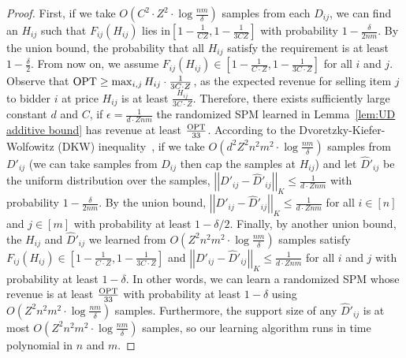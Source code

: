 \begin{proof}
	First, if we take $O\left(C^2\cdot Z^2\cdot \log \frac{nm}{\delta}\right)$ samples from each $D_{ij}$, we can find an $H_{ij}$ such that $F_{ij}(H_{ij})$ lies in$[1-\frac{1}{CZ}, 1-\frac{1}{3CZ}]$ with probability $1-\frac{\delta}{2nm}$. By the union bound, the probability that all $H_{ij}$ satisfy the requirement is at least $1-\frac{\delta}{2}$. From now on, we assume $F_{ij}(H_{ij})\in[1-\frac{1}{C\cdot Z}, 1-\frac{1}{3C\cdot Z}]$ for all $i$ and $j$. 
	Observe that $\text{OPT} \geq \max_{i,j} H_{ij}\cdot \frac{1}{3C\cdot Z}$, as the expected revenue for selling item $j$ to bidder $i$ at price $H_{ij}$ is at least $ \frac{H_{ij}}{3C\cdot Z}$.
	 Therefore, there exists sufficiently large constant $d$ and $C$, if $\epsilon=\frac{1}{d\cdot Z nm}$ the randomized SPM learned in Lemma~\ref{lem:UD additive bound} has revenue at least $\frac{\text{OPT}}{33}$.
	  According to the Dvoretzky-Kiefer-Wolfowitz (DKW) inequality~\cite{DvoretzkyKW56}, if we take $O\left(d^2 Z^2n^2m^2\cdot \log \frac{nm}{\delta} \right)$ samples from $D'_{ij}$ (we can take samples from $D_{ij}$ then cap the samples at $H_{ij}$) and let $\hat{D}'_{ij}$ be the uniform distribution over the samples, $\left|\left|D'_{ij}-\hat{D}'_{ij}\right|\right|_K\leq \frac{1}{d\cdot Z nm}$ with probability $1-\frac{\delta}{2nm}$. 
	  By the union bound,  $\left|\left|D'_{ij}-\hat{D}'_{ij}\right|\right|_K\leq \frac{1}{d\cdot Z nm}$ for all $i\in[n]$ and $j\in[m]$ with probability at least $1-\delta/2$.
	   Finally, by another union bound,  the $H_{ij}$ and $\hat{D}'_{ij}$ we learned from $O\left( Z^2n^2m^2\cdot \log \frac{nm}{\delta} \right)$ samples satisfy $F_{ij}(H_{ij})\in[1-\frac{1}{C\cdot Z}, 1-\frac{1}{3C\cdot Z}]$ and $\left|\left|D'_{ij}-\hat{D}'_{ij}\right|\right|_K\leq \frac{1}{d\cdot Z nm}$ for all $i$ and $j$ with probability at least $1-\delta$.
	   In other words, we can learn a randomized SPM whose revenue is at least $\frac{\text{OPT}}{33}$ with probability at least $1-\delta$ using $O\left( Z^2n^2m^2\cdot \log \frac{nm}{\delta} \right)$ samples.
	    Furthermore, the support size of any $\hat{D}'_{ij}$ is at most $O\left( Z^2n^2m^2\cdot \log \frac{nm}{\delta} \right)$ samples, so our learning algorithm runs in time polynomial in $n$ and $m$.
	
	

\end{proof}
